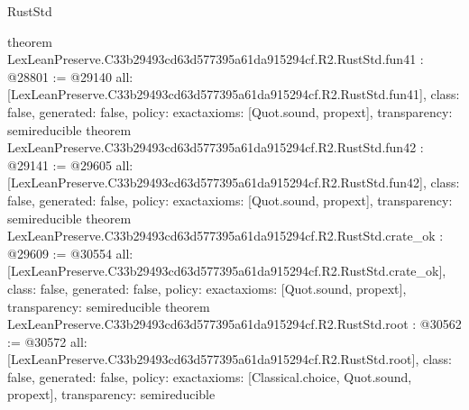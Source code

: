 \begin{lexlean}{RustStd}
\begin{coremodule}
{}
theorem LexLeanPreserve.C33b29493cd63d577395a61da915294cf.R2.RustStd.fun41 : @28801 := @29140 {
  all: [LexLeanPreserve.C33b29493cd63d577395a61da915294cf.R2.RustStd.fun41],
  class: false,
  generated: false,
  policy: exact{axioms: [Quot.sound, propext]},
  transparency: semireducible
}
theorem LexLeanPreserve.C33b29493cd63d577395a61da915294cf.R2.RustStd.fun42 : @29141 := @29605 {
  all: [LexLeanPreserve.C33b29493cd63d577395a61da915294cf.R2.RustStd.fun42],
  class: false,
  generated: false,
  policy: exact{axioms: [Quot.sound, propext]},
  transparency: semireducible
}
theorem LexLeanPreserve.C33b29493cd63d577395a61da915294cf.R2.RustStd.crate_ok : @29609 := @30554 {
  all: [LexLeanPreserve.C33b29493cd63d577395a61da915294cf.R2.RustStd.crate_ok],
  class: false,
  generated: false,
  policy: exact{axioms: [Quot.sound, propext]},
  transparency: semireducible
}
theorem LexLeanPreserve.C33b29493cd63d577395a61da915294cf.R2.RustStd.root : @30562 := @30572 {
  all: [LexLeanPreserve.C33b29493cd63d577395a61da915294cf.R2.RustStd.root],
  class: false,
  generated: false,
  policy: exact{axioms: [Classical.choice, Quot.sound, propext]},
  transparency: semireducible
}


\end{coremodule}
\end{lexlean}
